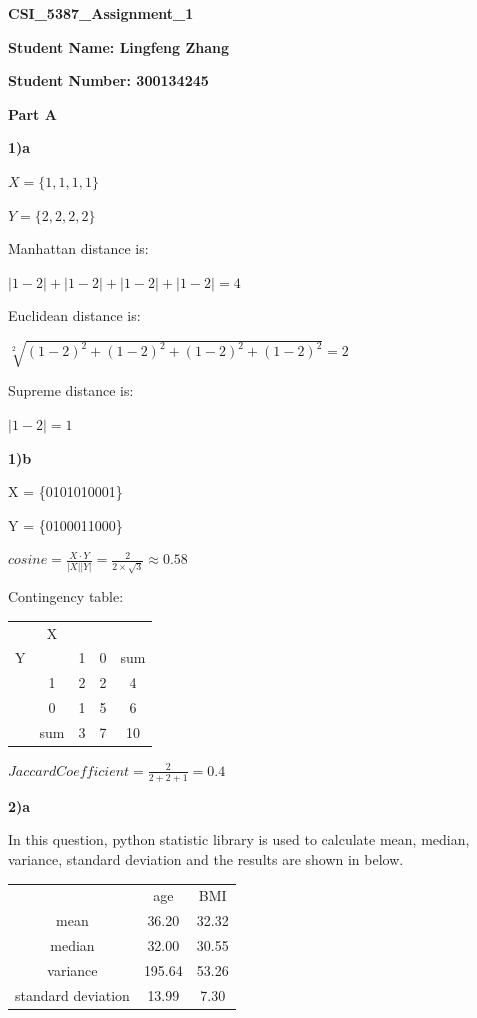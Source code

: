 \documentclass{article}
\begin{document}
\begin{center}
    \textbf{\huge{CSI\_5387\_Assignment\_1}}
\end{center}

\textbf{Student Name: Lingfeng Zhang}

\textbf{Student Number: 300134245}

\smallskip

\hline

\bigskip

\textbf{Part A}

\bigskip

\textbf{1)a}

$X = \{1,1,1,1\}$

$Y = \{2,2,2,2\}$

Manhattan distance is:

$|1-2| + |1-2| + |1-2| + |1-2| = 4$

Euclidean distance is:

$\sqrt[2]{(1-2)^2 + (1-2)^2 + (1-2)^2 + (1-2)^2} = 2$

Supreme distance is:

$|1-2| = 1$

\bigskip

\textbf{1)b}

X = \{0101010001\}

Y = \{0100011000\}

$cosine = \frac{X\cdot Y}{|X||Y|} = \frac{2}{2\times \sqrt{3}} \approx 0.58$

Contingency table:

\begin{center}
\begin{tabular}{c c c c c}
&X\\ 
Y & & 1 & 0 & sum\\ 
 &1 & 2 & 2 & 4\\  
 &0 & 1 & 5 & 6\\
 &sum & 3 & 7 & 10
\end{tabular}
\end{center}

$Jaccard Coefficient = \frac{2}{2+2+1} = 0.4$

\bigskip

\textbf{2)a}

In this question, python statistic library is used to calculate mean, median, variance, standard deviation and the results are shown in below.

\begin{center}
\begin{tabular}{c c c}
&age &BMI\\ 
mean &36.20 & 32.32\\
median &32.00 &30.55\\
variance &195.64 &53.26\\
standard deviation &13.99 &7.30
\end{tabular}
\end{center}
\end{document}
